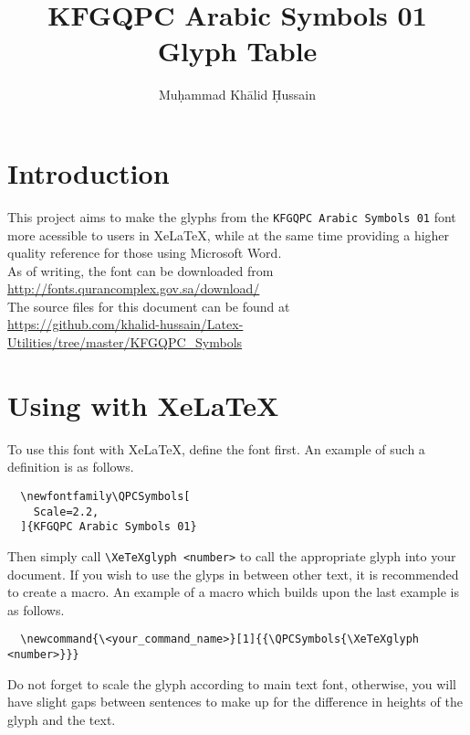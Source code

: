 \documentclass[parskip=full, oneside]{article}
\author{Muḥammad Khālid Ḥussain}
\title{KFGQPC Arabic Symbols 01 Glyph Table}
\date{\Hijritoday[1]}
\begin{document}
\maketitle

\begin{center}
\end{center}

\section{Introduction}

This project aims to make the glyphs from the \verb$KFGQPC Arabic Symbols 01$ 
font more acessible to users in XeLaTeX, while at the same time providing a 
higher quality reference for those using Microsoft Word.\\

As of writing, the font can be downloaded from\\
\url{http://fonts.qurancomplex.gov.sa/download/}\\

The source files for this document can be found at\\
\url{https://github.com/khalid-hussain/Latex-Utilities/tree/master/KFGQPC_Symbols}

\section{Using with XeLaTeX{}}

To use this font with XeLaTeX, define the font first. An example of such a 
definition is as follows.

  \begin{verbatim}
  \newfontfamily\QPCSymbols[
    Scale=2.2,
  ]{KFGQPC Arabic Symbols 01}
  \end{verbatim}

Then simply call \verb$\XeTeXglyph <number>$ to call the appropriate glyph into 
your document. If you wish to use the glyps in between other text, it is 
recommended to create a macro. An example of a macro which builds upon the last 
example is as follows.

  \begin{verbatim}
  \newcommand{\<your_command_name>}[1]{{\QPCSymbols{\XeTeXglyph <number>}}}
  \end{verbatim}

Do not forget to scale the glyph according to main text font, otherwise, you 
will have slight gaps between sentences to make up for the difference in 
heights of the glyph and the text.
\end{document}
